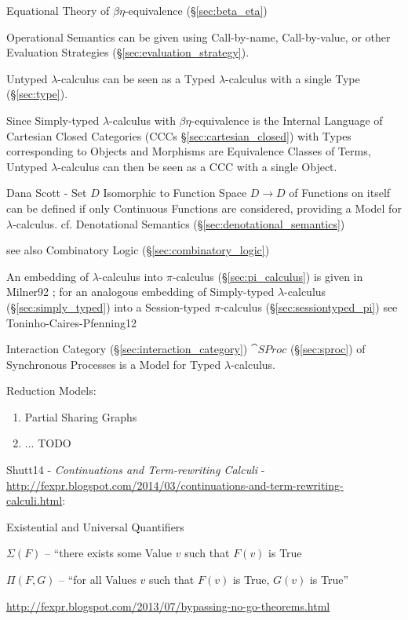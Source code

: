 \fist Equational Theory of $\beta\eta$-equivalence (\S\ref{sec:beta_eta})

Operational Semantics can be given using Call-by-name, Call-by-value, or other
Evaluation Strategies (\S\ref{sec:evaluation_strategy}).

Untyped $\lambda$-calculus can be seen as a Typed $\lambda$-calculus
with a single Type (\S\ref{sec:type}).

Since Simply-typed $\lambda$-calculus with $\beta\eta$-equivalence is the
Internal Language of Cartesian Closed Categories (CCCs
\S\ref{sec:cartesian_closed}) with Types corresponding to Objects and Morphisms
are Equivalence Classes of Terms, Untyped $\lambda$-calculus can then be seen
as a CCC with a single Object.

Dana Scott - Set $D$ Isomorphic to Function Space $D \rightarrow D$ of
Functions on itself can be defined if only Continuous Functions are
considered, providing a Model for $\lambda$-calculus. cf. Denotational
Semantics (\S\ref{sec:denotational_semantics})

\fist see also Combinatory Logic (\S\ref{sec:combinatory_logic})

\fist An embedding of $\lambda$-calculus into $\pi$-calculus
(\S\ref{sec:pi_calculus}) is given in Milner92 \cite{milner92}; for an
analogous embedding of Simply-typed $\lambda$-calculus
(\S\ref{sec:simply_typed}) into a Session-typed $\pi$-calculus
(\S\ref{sec:sessiontyped_pi}) see Toninho-Caires-Pfenning12
\cite{caires-pfenning-toninho12}

Interaction Category (\S\ref{sec:interaction_category}) $\cat{SProc}$
(\S\ref{sec:sproc}) of Synchronous Processes is a Model for Typed
$\lambda$-calculus.

Reduction Models:
\begin{enumerate}
  \item Partial Sharing Graphs
  \item ... TODO
\end{enumerate}


Shutt14 - \emph{Continuations and Term-rewriting Calculi} -
\url{http://fexpr.blogspot.com/2014/03/continuations-and-term-rewriting-calculi.html}:

Existential and Universal Quantifiers

$\Sigma(F)$ -- ``there exists some Value $v$ such that $F(v)$ is True

$\Pi(F,G)$ -- ``for all Values $v$ such that $F(v)$ is True, $G(v)$ is
True''

\url{http://fexpr.blogspot.com/2013/07/bypassing-no-go-theorems.html}


